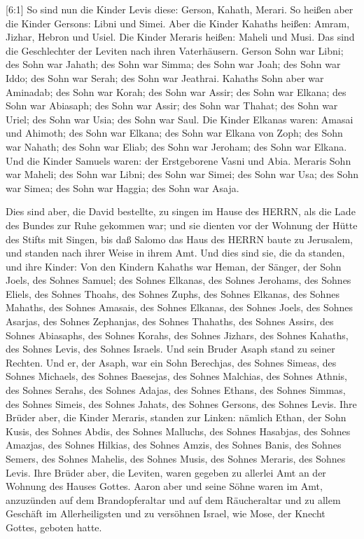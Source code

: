  {[}6:1{]} So sind nun die Kinder Levis diese: Gerson,
Kahath, Merari.  So heißen aber die Kinder Gersons: Libni
und Simei.  Aber die Kinder Kahaths heißen: Amram, Jizhar,
Hebron und Usiel.  Die Kinder Meraris heißen: Maheli und
Musi. Das sind die Geschlechter der Leviten nach ihren Vaterhäusern.
 Gerson Sohn war Libni; des Sohn war Jahath; des Sohn war
Simma;  des Sohn war Joah; des Sohn war Iddo; des Sohn war
Serah; des Sohn war Jeathrai.  Kahaths Sohn aber war
Aminadab; des Sohn war Korah; des Sohn war Assir;  des Sohn
war Elkana; des Sohn war Abiasaph; des Sohn war Assir;  des
Sohn war Thahat; des Sohn war Uriel; des Sohn war Usia; des Sohn war
Saul.  Die Kinder Elkanas waren: Amasai und Ahimoth;
 des Sohn war Elkana; des Sohn war Elkana von Zoph; des
Sohn war Nahath;  des Sohn war Eliab; des Sohn war Jeroham;
des Sohn war Elkana.  Und die Kinder Samuels waren: der
Erstgeborene Vasni und Abia.  Meraris Sohn war Maheli; des
Sohn war Libni; des Sohn war Simei; des Sohn war Usa;  des
Sohn war Simea; des Sohn war Haggia; des Sohn war Asaja.

 Dies sind aber, die David bestellte, zu singen im Hause
des HERRN, als die Lade des Bundes zur Ruhe gekommen war; 
und sie dienten vor der Wohnung der Hütte des Stifts mit Singen, bis daß
Salomo das Haus des HERRN baute zu Jerusalem, und standen nach ihrer
Weise in ihrem Amt.  Und dies sind sie, die da standen, und
ihre Kinder: Von den Kindern Kahaths war Heman, der Sänger, der Sohn
Joels, des Sohnes Samuel;  des Sohnes Elkanas, des Sohnes
Jerohams, des Sohnes Eliels, des Sohnes Thoahs,  des Sohnes
Zuphs, des Sohnes Elkanas, des Sohnes Mahaths, des Sohnes Amasais,
 des Sohnes Elkanas, des Sohnes Joels, des Sohnes Asarjas,
des Sohnes Zephanjas,  des Sohnes Thahaths, des Sohnes
Assirs, des Sohnes Abiasaphs, des Sohnes Korahs,  des
Sohnes Jizhars, des Sohnes Kahaths, des Sohnes Levis, des Sohnes
Israels.  Und sein Bruder Asaph stand zu seiner Rechten.
Und er, der Asaph, war ein Sohn Berechjas, des Sohnes Simeas,
 des Sohnes Michaels, des Sohnes Baesejas, des Sohnes
Malchias,  des Sohnes Athnis, des Sohnes Serahs, des Sohnes
Adajas,  des Sohnes Ethans, des Sohnes Simmas, des Sohnes
Simeis,  des Sohnes Jahats, des Sohnes Gersons, des Sohnes
Levis.  Ihre Brüder aber, die Kinder Meraris, standen zur
Linken: nämlich Ethan, der Sohn Kusis, des Sohnes Abdis, des Sohnes
Malluchs,  des Sohnes Hasabjas, des Sohnes Amazjas, des
Sohnes Hilkias,  des Sohnes Amzis, des Sohnes Banis, des
Sohnes Semers,  des Sohnes Mahelis, des Sohnes Musis, des
Sohnes Meraris, des Sohnes Levis.  Ihre Brüder aber, die
Leviten, waren gegeben zu allerlei Amt an der Wohnung des Hauses Gottes.
 Aaron aber und seine Söhne waren im Amt, anzuzünden auf
dem Brandopferaltar und auf dem Räucheraltar und zu allem Geschäft im
Allerheiligsten und zu versöhnen Israel, wie Mose, der Knecht Gottes,
geboten hatte.

